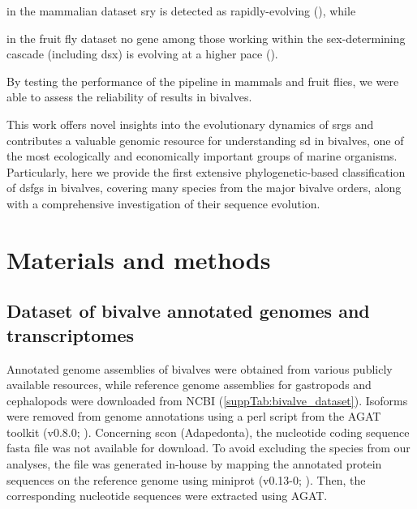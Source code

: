 \begin{inlinelist}
	\item in the mammalian dataset \gls{sry} is detected as rapidly-evolving (), while
	\item in the fruit fly dataset no gene among those working within the sex-determining cascade (including \gls{dsx}) is evolving at a higher pace ().
\end{inlinelist}
By testing the performance of the pipeline in mammals and fruit flies, we were able to assess the reliability of results in bivalves.

This work offers novel insights into the evolutionary dynamics of \glspl{srg} and contributes a valuable genomic resource for understanding \gls{sd} in bivalves, one of the most ecologically and economically important groups of marine organisms. Particularly, here we provide the first extensive phylogenetic-based classification of \glspl{dsfg} in bivalves, covering many species from the major bivalve orders, along with a comprehensive investigation of their sequence evolution.

\section{Materials and methods} \label{chapter:molecularEvolution-MM}
\subsection{Dataset of bivalve annotated genomes and transcriptomes}
Annotated genome assemblies of bivalves were obtained from various publicly available resources, while reference genome assemblies for gastropods and cephalopods were downloaded from NCBI (\cref{suppTab:bivalve_dataset}). Isoforms were removed from genome annotations using a perl script from the AGAT toolkit (v0.8.0; ). Concerning \gls{scon} (Adapedonta), the nucleotide coding sequence fasta file was not available for download. To avoid excluding the species from our analyses, the file was generated in-house by mapping the annotated protein sequences on the reference genome using miniprot (v0.13-0; ). Then, the corresponding nucleotide sequences were extracted using AGAT.

